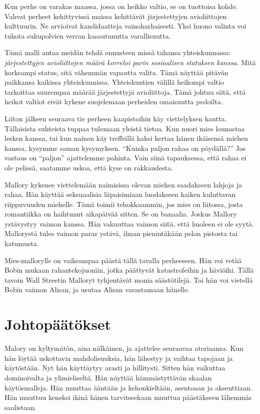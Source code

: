 Kun perhe on varakas maassa, jossa on heikko valtio, se on tuottoisa kohde. Vahvat perheet kehittyvissä maissa kehittävät järjestettyjen avioliittojen kulttuurin. Ne arvioivat kandidaatteja vainoharhaisesti. Yksi huono valinta voi tuhota sukupolvien verran kasautunutta varallisuutta.

Tämä malli antaa meidän tehdä ennusteen missä tahansa yhteiskunnassa: \emph{järjestettyjen avioliittojen määrä korreloi parin sosiaalisen statuksen kanssa.} Mitä korkeampi status, sitä vähemmän vapautta valita. Tämä näyttää pitävän paikkansa kaikissa yhteiskunnissa. Yhteiskuntien välillä heikompi valtio tarkoittaa suurempaa määrää järjestettyjä avioliittoja. Tämä johtuu siitä, että heikot valtiot eivät kykene suojelemaan perheiden omaisuutta pedoilta.

Liiton jälkeen seuraava tie perheen kaapistoihin käy viettelyksen kautta. Tällaisista suhteista tuppaa tulemaan yleistä tietoa. Kun nuori mies lounastaa lesken kanssa, tai kun nainen käy treffeillä kaksi kertaa hänen ikäisensä miehen kanssa, kysymme saman kysymyksen. ``Kuinka paljon rahaa on pöydällä?'' Jos vastaus on ``paljon\vmq{,}'' ajattelemme pahinta. Vain siinä tapauksessa, että rahaa ei ole pelissä, saatamme uskoa, että kyse on rakkaudesta.

Mallory kykenee viettelemään naimisissa olevan miehen saadakseen lahjoja ja rahaa. Hän käyttää seksuaalisia liipaisimiaan luodakseen kaiken kuluttavan riippuvuuden miehelle. Tämä toimii tehokkaammin, jos mies on liitossa, josta romantiikka on haihtunut aikapäivää sitten. Se on banaalia. Joskus Mallory ystävystyy vaimon kanssa. Hän vakuuttaa vaimon siitä, että huoleen ei ole syytä. Mallorystä tulee vaimon paras ystävä, ilman pienintäkään pelon pistosta tai katumusta.

Mies-mallorylle on vaikeampaa päästä tällä tavalla perheeseen. Hän voi vetää Bobin mukaan rahantekojuoniin, jotka päättyvät katastrofeihin ja häviöihi. Tällä tavoin Wall Streetin Malloryt tyhjentävät monia säästötilejä. Tai hän voi vietellä Bobin vaimon Alisan, ja usutaa Alisan varastamaan hänelle.

\section{Johtopäätökset}

Malory on kyltymätön, aina nälkäinen, ja ajattelee seuraavaa ateriaansa. Kun hän löytää uskottavia mahdolisuuksia, hän lähestyy ja vaihtaa tapojaan ja käytöstään. Nyt hän käyttäytyy arasti ja hillitysti. Sitten hän vaikuttaa dominoivalta ja ylimieliseltä. Hän näyttää hämmästyttävän skaalan käytösmalleja. Hän muuttaa ääntään ja kehonkieltään, asentoaan ja aksenttiaan. Hän muuttuu keneksi ikinä hänen tarvitseekaan muuttua päästäkseen lähemmäs saalistaan.

